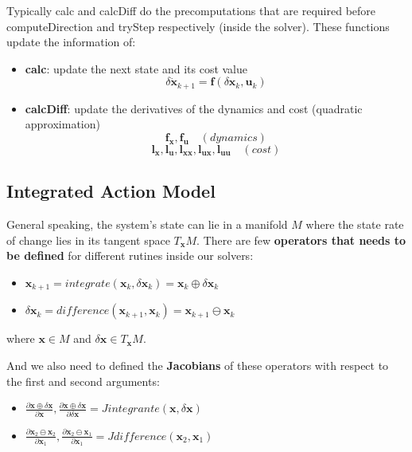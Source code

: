 Typically calc and calcDiff do the precomputations that are required before computeDirection and tryStep respectively (inside the solver). These functions update the information of:
\begin{itemize}
\item \textbf{calc}: update the next state and its cost value
 $$\delta\mathbf{\dot{x}}_{k+1} = \mathbf{f}(\delta\mathbf{x}_k,\mathbf{u}_k)$$
\item \textbf{calcDiff}: update the derivatives of the dynamics and cost (quadratic approximation)
 $$\mathbf{f_x}, \mathbf{f_u} \hspace{1em} (dynamics)$$
 $$\mathbf{l_x}, \mathbf{l_u}, \mathbf{l_{xx}}, \mathbf{l_{ux}}, \mathbf{l_{uu}} \hspace{1em} (cost)$$
\end{itemize}
 
\subsection{Integrated Action Model}
General speaking, the system's state can lie in a manifold $M$ where the state rate of change lies in its tangent space $T_\mathbf{x}M$. There are few \textbf{operators that needs to be defined} for different rutines inside our solvers:
\begin{itemize}
\item$\mathbf{x}_{k+1} = integrate(\mathbf{x}_k,\delta\mathbf{x}_k) = \mathbf{x}_k \oplus \delta\mathbf{x}_k$
\item$\delta\mathbf{x}_k = difference(\mathbf{x}_{k+1},\mathbf{x}_k) = \mathbf{x}_{k+1} \ominus \mathbf{x}_k$
\end{itemize}

where $\mathbf{x}\in M$ and $\delta\mathbf{x}\in T_\mathbf{x} M$.
 
And we also need to defined the \textbf{Jacobians} of these operators with respect to the first and second arguments:
\begin{itemize}
\item $\frac{\partial \mathbf{x}\oplus\delta\mathbf{x}}{\partial \mathbf{x}}, \frac{\partial \mathbf{x}\oplus\delta\mathbf{x}}{\partial\delta\mathbf{x}} =Jintegrante(\mathbf{x},\delta\mathbf{x})$
\item $\frac{\partial\mathbf{x}_2\ominus\mathbf{x}_2}{\partial \mathbf{x}_1}, \frac{\partial \mathbf{x}_2\ominus\mathbf{x}_1}{\partial\mathbf{x}_1} =Jdifference(\mathbf{x}_2,\mathbf{x}_1)$
\end{itemize}

